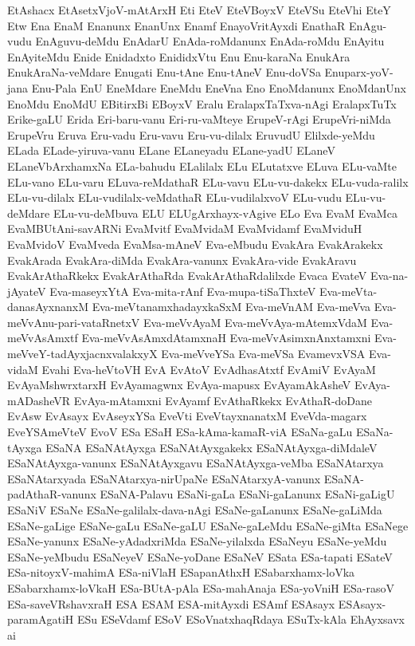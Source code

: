 {EtAshacx
EtAsetxVjoV-mAtArxH
Eti
EteV
EteVBoyxV
EteVSu
EteVhi
EteY
Etw
Ena
EnaM
Enanunx
EnanUnx
Enamf
EnayoVritAyxdi
EnathaR
EnAgu-vudu
EnAguvu-deMdu
EnAdarU
EnAda-roMdanunx
EnAda-roMdu
EnAyitu
EnAyiteMdu
Enide
Enidadxto
EnididxVtu
Enu
Enu-karaNa
EnukAra
EnukAraNa-veMdare
Enugati
Enu-tAne
Enu-tAneV
Enu-doVSa
Enuparx-yoV-jana
Enu-Pala
EnU
EneMdare
EneMdu
EneVna
Eno
EnoMdanunx
EnoMdanUnx
EnoMdu
EnoMdU
EBitirxBi
EBoyxV
Eralu
EralapxTaTxva-nAgi
EralapxTuTx
Erike-gaLU
Erida
Eri-baru-vanu
Eri-ru-vaMteye
ErupeV-rAgi
ErupeVri-niMda
ErupeVru
Eruva
Eru-vadu
Eru-vavu
Eru-vu-dilalx
EruvudU
Elilxde-yeMdu
ELada
ELade-yiruva-vanu
ELane
ELaneyadu
ELane-yadU
ELaneV
ELaneVbArxhamxNa
ELa-bahudu
ELalilalx
ELu
ELutatxve
ELuva
ELu-vaMte
ELu-vano
ELu-varu
ELuva-reMdathaR
ELu-vavu
ELu-vu-dakekx
ELu-vuda-ralilx
ELu-vu-dilalx
ELu-vudilalx-veMdathaR
ELu-vudilalxvoV
ELu-vudu
ELu-vu-deMdare
ELu-vu-deMbuva
ELU
ELUgArxhayx-vAgive
ELo
Eva
EvaM
EvaMca
EvaMBUtAni-savARNi
EvaMvitf
EvaMvidaM
EvaMvidamf
EvaMviduH
EvaMvidoV
EvaMveda
EvaMsa-mAneV
Eva-eMbudu
EvakAra
EvakArakekx
EvakArada
EvakAra-diMda
EvakAra-vanunx
EvakAra-vide
EvakAravu
EvakArAthaRkekx
EvakArAthaRda
EvakArAthaRdalilxde
Evaca
EvateV
Eva-na-jAyateV
Eva-maseyxYtA
Eva-mita-rAnf
Eva-mupa-tiSaThxteV
Eva-meVta-danasAyxnanxM
Eva-meVtanamxhadayxkaSxM
Eva-meVnAM
Eva-meVva
Eva-meVvAnu-pari-vataRnetxV
Eva-meVvAyaM
Eva-meVvAya-mAtemxVdaM
Eva-meVvAsAmxtf
Eva-meVvAsAmxdAtamxnaH
Eva-meVvAsimxnAnxtamxni
Eva-meVveY-tadAyxjacnxvalakxyX
Eva-meVveYSa
Eva-meVSa
EvamevxVSA
Eva-vidaM
Evahi
Eva-heVtoVH
EvA
EvAtoV
EvAdhasAtxtf
EvAmiV
EvAyaM
EvAyaMshwrxtarxH
EvAyamagwnx
EvAya-mapusx
EvAyamAkAsheV
EvAya-mADasheVR
EvAya-mAtamxni
EvAyamf
EvAthaRkekx
EvAthaR-doDane
EvAsw
EvAsayx
EvAseyxYSa
EveVti
EveVtayxnanatxM
EveVda-magarx
EveYSAmeVteV
EvoV
ESa
ESaH
ESa-kAma-kamaR-viA
ESaNa-gaLu
ESaNa-tAyxga
ESaNA
ESaNAtAyxga
ESaNAtAyxgakekx
ESaNAtAyxga-diMdaleV
ESaNAtAyxga-vanunx
ESaNAtAyxgavu
ESaNAtAyxga-veMba
ESaNAtarxya
ESaNAtarxyada
ESaNAtarxya-nirUpaNe
ESaNAtarxyA-vanunx
ESaNA-padAthaR-vanunx
ESaNA-Palavu
ESaNi-gaLa
ESaNi-gaLanunx
ESaNi-gaLigU
ESaNiV
ESaNe
ESaNe-galilalx-dava-nAgi
ESaNe-gaLanunx
ESaNe-gaLiMda
ESaNe-gaLige
ESaNe-gaLu
ESaNe-gaLU
ESaNe-gaLeMdu
ESaNe-giMta
ESaNege
ESaNe-yanunx
ESaNe-yAdadxriMda
ESaNe-yilalxda
ESaNeyu
ESaNe-yeMdu
ESaNe-yeMbudu
ESaNeyeV
ESaNe-yoDane
ESaNeV
ESata
ESa-tapati
ESateV
ESa-nitoyxV-mahimA
ESa-niVlaH
ESapanAthxH
ESabarxhamx-loVka
ESabarxhamx-loVkaH
ESa-BUtA-pAla
ESa-mahAnaja
ESa-yoVniH
ESa-rasoV
ESa-saveVRshavxraH
ESA
ESAM
ESA-mitAyxdi
ESAmf
ESAsayx
ESAsayx-paramAgatiH
ESu
ESeVdamf
ESoV
ESoVnatxhaqRdaya
ESuTx-kAla
EhAyxsavx
ai
}
